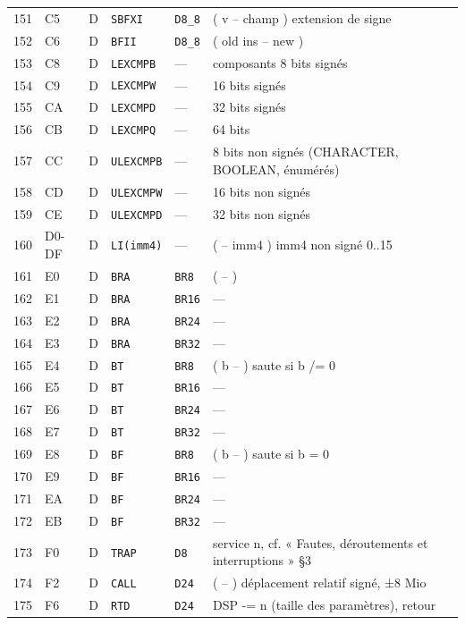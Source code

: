 \documentclass[10pt,a4paper,twoside,openany]{book}
\begin{document}
\begin{landscape}
\begin{longtable}{@{}r l c l l p{10.7cm}@{}}
151 & C5 & D & \texttt{SBFXI} & \texttt{D8\_8} & ( v -- champ )		extension de signe\\
152 & C6 & D & \texttt{BFII} & \texttt{D8\_8} & ( old ins -- new )\\
153 & C8 & D & \texttt{LEXCMPB} & --- & composants 8 bits signés\\
154 & C9 & D & \texttt{LEXCMPW} & --- & 16 bits signés\\
155 & CA & D & \texttt{LEXCMPD} & --- & 32 bits signés\\
156 & CB & D & \texttt{LEXCMPQ} & --- & 64 bits\\
157 & CC & D & \texttt{ULEXCMPB} & --- & 8 bits non signés (CHARACTER, BOOLEAN, énumérés)\\
158 & CD & D & \texttt{ULEXCMPW} & --- & 16 bits non signés\\
159 & CE & D & \texttt{ULEXCMPD} & --- & 32 bits non signés\\
160 & D0-DF & D & \texttt{LI(imm4)} & --- & ( -- imm4 )		imm4 non signé 0..15\\
161 & E0 & D & \texttt{BRA} & \texttt{BR8} & ( -- )\\
162 & E1 & D & \texttt{BRA} & \texttt{BR16} & ---\\
163 & E2 & D & \texttt{BRA} & \texttt{BR24} & ---\\
164 & E3 & D & \texttt{BRA} & \texttt{BR32} & ---\\
165 & E4 & D & \texttt{BT} & \texttt{BR8} & ( b -- )	saute si b /= 0\\
166 & E5 & D & \texttt{BT} & \texttt{BR16} & ---\\
167 & E6 & D & \texttt{BT} & \texttt{BR24} & ---\\
168 & E7 & D & \texttt{BT} & \texttt{BR32} & ---\\
169 & E8 & D & \texttt{BF} & \texttt{BR8} & ( b -- )	saute si b = 0\\
170 & E9 & D & \texttt{BF} & \texttt{BR16} & ---\\
171 & EA & D & \texttt{BF} & \texttt{BR24} & ---\\
172 & EB & D & \texttt{BF} & \texttt{BR32} & ---\\
173 & F0 & D & \texttt{TRAP} & \texttt{D8} & service n, cf. « Fautes, déroutements et interruptions » §3\\
174 & F2 & D & \texttt{CALL} & \texttt{D24} & ( -- ) déplacement relatif signé, ±8 Mio\\
175 & F6 & D & \texttt{RTD} & \texttt{D24} & DSP -= n (taille des paramètres), retour\\

\end{longtable}
\end{landscape}
\end{document}
